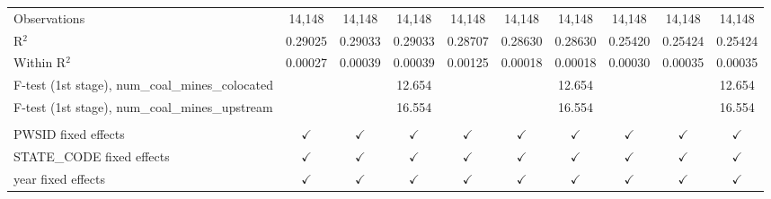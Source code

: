 \begin{table}[htbp]
\begin{adjustbox}{width = \textwidth, center}
\begin{tabular}{lccccccccc}
          \\
         Observations                                       & 14,148        & 14,148        & 14,148        & 14,148         & 14,148        & 14,148        & 14,148        & 14,148        & 14,148\\  
         R$^2$                                              & 0.29025       & 0.29033       & 0.29033       & 0.28707        & 0.28630       & 0.28630       & 0.25420       & 0.25424       & 0.25424\\  
         Within R$^2$                                       & 0.00027       & 0.00039       & 0.00039       & 0.00125        & 0.00018       & 0.00018       & 0.00030       & 0.00035       & 0.00035\\  
         F-test (1st stage), num\_coal\_mines\_colocated    &               &               & 12.654        &                &               & 12.654        &               &               & 12.654\\  
         F-test (1st stage), num\_coal\_mines\_upstream     &               &               & 16.554        &                &               & 16.554        &               &               & 16.554\\  
          \\
         PWSID fixed effects                                & $\checkmark$  & $\checkmark$  & $\checkmark$  & $\checkmark$   & $\checkmark$  & $\checkmark$  & $\checkmark$  & $\checkmark$  & $\checkmark$\\   
         STATE\_CODE fixed effects                          & $\checkmark$  & $\checkmark$  & $\checkmark$  & $\checkmark$   & $\checkmark$  & $\checkmark$  & $\checkmark$  & $\checkmark$  & $\checkmark$\\   
         year fixed effects                                 & $\checkmark$  & $\checkmark$  & $\checkmark$  & $\checkmark$   & $\checkmark$  & $\checkmark$  & $\checkmark$  & $\checkmark$  & $\checkmark$\\   
         \bottomrule
      \end{tabular}
   \end{adjustbox}
\end{table}



